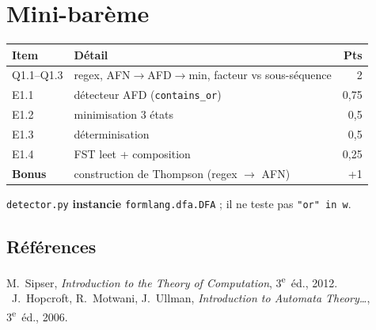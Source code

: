 \documentclass[11pt,a4paper]{scrartcl}
\begin{document}
\section*{Mini-barème}
\begin{center}\small
\begin{tabular}{@{}llr@{}}
\toprule Item & Détail & Pts\\\midrule
Q1.1–Q1.3 & regex, AFN$\to$AFD$\to$min, facteur vs sous-séquence & 2\\
E1.1 & détecteur AFD (\texttt{contains\_or}) & 0,75\\
E1.2 & minimisation 3 états & 0,5\\
E1.3 & déterminisation & 0,5\\
E1.4 & FST leet + composition & 0,25\\
\textbf{Bonus} & construction de Thompson (regex $\to$ AFN) & +1\\
\bottomrule
\end{tabular}
\end{center}

\begin{gate}
\texttt{detector.py} \textbf{instancie} \texttt{formlang.dfa.DFA} ; il ne teste pas
\texttt{"or" in w}.
\end{gate}

\subsection*{Références}
M.~Sipser, \emph{Introduction to the Theory of Computation}, 3\textsuperscript{e}~éd.,
2012. \textbullet\ J.~Hopcroft, R.~Motwani, J.~Ullman, \emph{Introduction to Automata
Theory\dots}, 3\textsuperscript{e}~éd., 2006.
\end{document}

